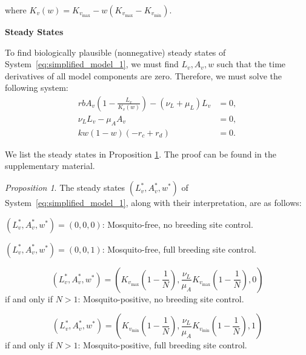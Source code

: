 \documentclass{article}
\theoremstyle{remark}
\theoremstyle{custom} %
\newtheorem{proposition}{Proposition}
\begin{document}
where $K_v(w) = K_{v_{\text{max}}} - w(K_{v_{\text{max}}} - K_{v_{\text{min}}})$.




\textbf{Steady States}


To find biologically plausible (nonnegative) steady states of System~\eqref{eq:simplified_model_1}, we must find $L_v, A_v, w$ such that the time derivatives of all model components are zero. Therefore, we must solve the following system:
\begin{equation*}
\begin{aligned}
rb A_v \left(1 - \frac{L_v}{K_v(w)} \right) - (\nu_L + \mu_L) L_v &= 0, \\
\nu_L L_v - \mu_A A_v &= 0, \\
kw(1 - w)(-r_c + r_d) &= 0.
\end{aligned}
\end{equation*}

We list the steady states in Proposition \ref{prop: Baseline Model}. The proof can be found in the supplementary material. 

\begin{proposition}\label{prop: Baseline Model}
The steady states \((L_v^*, A_v^*, w^*)\) of System~\eqref{eq:simplified_model_1}, along with their interpretation, are as follows:


\underline{} $\left(L_v^*, A_v^*, w^*\right)=(0,0,0)$: Mosquito-free, no breeding site control.

\underline{} $\left(L_v^*, A_v^*, w^*\right)=(0,0,1)$: Mosquito-free, full breeding site control.

\underline{}
$$
\left(L_v^*, A_v^*, w^*\right)=\left(K_{v_{\max }}\left(1-\frac{1}{{N}}\right), \frac{\nu_L}{\mu_A} K_{v_{\max }}\left(1-\frac{1}{{N}}\right), 0\right)
$$
if and only if ${N}>1$: Mosquito-positive, no breeding site control.

\underline{}
$$
\left(L_v^*, A_v^*, w^*\right)=\left(K_{v_{\min }}\left(1-\frac{1}{{N}}\right), \frac{\nu_L}{\mu_A} K_{v_{\min }}\left(1-\frac{1}{{N}}\right), 1\right)
$$
if and only if ${N}>1$: Mosquito-positive, full breeding site control.

\end{proposition}
\end{document}
